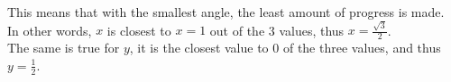\documentclass[preview]{standalone}
\begin{document}
\begin{center}
This means that with the smallest angle, the least amount of progress is made. \\ In other words, $x$ is closest to $x=1$ out of the 3 values, thus $x = \frac{\sqrt{3}}{2}$. \\ The same is true for $y$, it is the closest value to 0 of the three values, and thus $y = \frac{1}{2}$.
\end{center}
\end{document}
